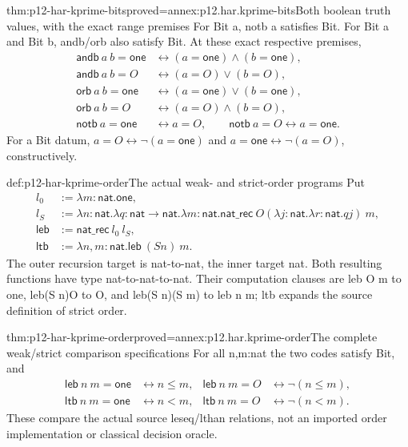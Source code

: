 \begin{hblemma}{thm:p12-har-kprime-bits}{proved=annex:p12.har.kprime-bits}{Both boolean truth values, with the exact range premises}
For Bit a, notb a satisfies Bit. For Bit a and Bit b, andb/orb
also satisfy Bit. At these exact respective premises,
\[
\begin{aligned}
 \mathsf{andb}\ a\ b=\mathsf{one}&\leftrightarrow
          (a=\mathsf{one})\wedge(b=\mathsf{one}),\\
 \mathsf{andb}\ a\ b=O&\leftrightarrow
          (a=O)\vee(b=O),\\
 \mathsf{orb}\ a\ b=\mathsf{one}&\leftrightarrow
          (a=\mathsf{one})\vee(b=\mathsf{one}),\\
 \mathsf{orb}\ a\ b=O&\leftrightarrow(a=O)\wedge(b=O),\\
 \mathsf{notb}\ a=\mathsf{one}&\leftrightarrow a=O,\qquad
 \mathsf{notb}\ a=O\leftrightarrow a=\mathsf{one}.
\end{aligned}
\]
For a Bit datum, \(a=O\leftrightarrow\neg(a=\mathsf{one})\)
and \(a=\mathsf{one}\leftrightarrow\neg(a=O)\), constructively.
\end{hblemma}

\begin{hbdefinition}{def:p12-har-kprime-order}{The actual weak- and strict-order programs}
Put
\[
\begin{aligned}
 l_0&:=\lambda m:\mathsf{nat}.\mathsf{one},\\
 l_S&:=\lambda n:\mathsf{nat}.\lambda q:\mathsf{nat}\to\mathsf{nat}.
  \lambda m:\mathsf{nat}.
    \mathsf{nat\_rec}\ O
      (\lambda j:\mathsf{nat}.\lambda r:\mathsf{nat}.q j)\ m,\\
 \mathsf{leb}&:=\mathsf{nat\_rec}\ l_0\ l_S,\\
 \mathsf{ltb}&:=\lambda n,m:\mathsf{nat}.\mathsf{leb}\ (S n)\ m.
\end{aligned}
\]
The outer recursion target is nat-to-nat, the inner target nat.
Both resulting functions have type nat-to-nat-to-nat. Their computation
clauses are leb O m to one, leb(S n)O to O, and
leb(S n)(S m) to leb n m; ltb expands the source definition of strict order.
\end{hbdefinition}

\begin{hblemma}{thm:p12-har-kprime-order}{proved=annex:p12.har.kprime-order}{The complete weak/strict comparison specifications}
For all n,m:nat the two codes satisfy Bit, and
\[
\begin{aligned}
 \mathsf{leb}\ n\ m=\mathsf{one}&\leftrightarrow n\le m,&
 \mathsf{leb}\ n\ m=O&\leftrightarrow\neg(n\le m),\\
 \mathsf{ltb}\ n\ m=\mathsf{one}&\leftrightarrow n<m,&
 \mathsf{ltb}\ n\ m=O&\leftrightarrow\neg(n<m).
\end{aligned}
\]
These compare the actual source leseq/lthan relations, not an imported
order implementation or classical decision oracle.
\end{hblemma}

